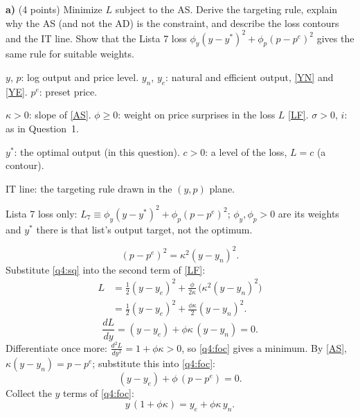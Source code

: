 \textbf{a)} (4 points) Minimize $L$ subject to the AS. Derive the targeting rule, explain why the AS (and not the AD) is the constraint,
and describe the loss contours and the IT line. Show that the Lista 7 loss $\phi_y(y-y^*)^2+\phi_p(p-p^e)^2$ gives the same rule for suitable weights.
\resolespaco
\begin{sol}
\begin{notacao}
\item $y$, $p$: log output and price level. $y_n$, $y_e$: natural and efficient output, \eqref{YN} and \eqref{YE}. $p^e$: preset price.
\item $\kappa>0$: slope of \eqref{AS}. $\phi\ge0$: weight on price surprises in the loss $L$ \eqref{LF}. $\sigma>0$, $i$: as in Question~1.
\item $y^*$: the optimal output (in this question). $c>0$: a level of the loss, $L=c$ (a contour).
\item IT line: the targeting rule drawn in the $(y,p)$ plane.
\item Lista 7 loss only: $L_7\equiv\phi_y(y-y^*)^2+\phi_p(p-p^e)^2$; $\phi_y,\phi_p>0$ are its weights and $y^*$ there is that list's output target, not the optimum.
\end{notacao}
\begin{equation}
(p-p^e)^2=\kappa^2(y-y_n)^2 . \label{q4:sq}
\end{equation}
Substitute \eqref{q4:sq} into the second term of \eqref{LF}:
\begin{align}
L&=\tfrac12(y-y_e)^2+\tfrac{\phi}{2\kappa}\,\big(\kappa^2(y-y_n)^2\big)\nonumber\\
&=\tfrac12(y-y_e)^2+\tfrac{\phi\kappa}{2}(y-y_n)^2 . \label{q4:Ly}
\end{align}
\begin{equation}
\frac{dL}{dy}=(y-y_e)+\phi\kappa\,(y-y_n)=0 . \label{q4:foc}
\end{equation}
Differentiate once more: $\frac{d^2L}{dy^2}=1+\phi\kappa>0$, so \eqref{q4:foc} gives a minimum. By \eqref{AS}, $\kappa(y-y_n)=p-p^e$; substitute
this into \eqref{q4:foc}:
\begin{equation}
(y-y_e)+\phi\,(p-p^e)=0 . \label{q4:rule}
\end{equation}
Collect the $y$ terms of \eqref{q4:foc}:
\begin{equation}
y\,(1+\phi\kappa)=y_e+\phi\kappa\,y_n . \nonumber
\end{equation}

\end{sol}
